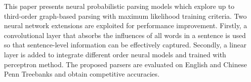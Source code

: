 This paper presents neural probabilistic parsing models which explore up to third-order graph-based parsing with maximum likelihood training criteria. Two neural network extensions are exploited for performance improvement. Firstly, a convolutional layer that absorbs the influences of all words in a sentence is used so that sentence-level information can be effectively captured. Secondly, a linear layer is added to integrate different order neural models and trained with perceptron method. The proposed parsers are evaluated on English and Chinese Penn Treebanks and obtain competitive accuracies.
